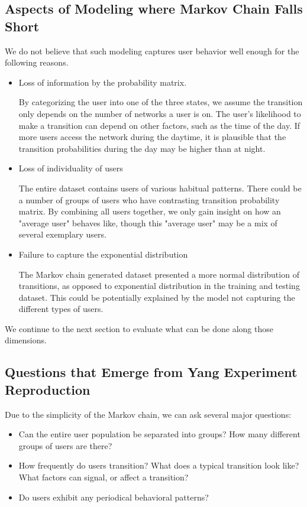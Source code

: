 \documentclass[]{article}
\begin{document}
\subsection{Aspects of Modeling where Markov Chain Falls Short}
We do not believe that such modeling captures user behavior well enough for the following reasons.

\begin{itemize}
\item
Loss of information by the probability matrix.

By categorizing the user into one of the three states, we assume the transition only depends on the number of networks a user is on. The user's likelihood to make a transition can depend on other factors, such as the time of the day. If more users access the network during the daytime, it is plausible that the transition probabilities during the day may be higher than at night.

\item
Loss of individuality of users

The entire dataset contains users of various habitual patterns. There could be a number of groups of users who have contrasting transition probability matrix. By combining all users together, we only gain insight on how an "average user" behaves like, though this "average user" may be a mix of several exemplary users.

\item
Failure to capture the exponential distribution

The Markov chain generated dataset presented a more normal distribution of transitions, as opposed to exponential distribution in the training and testing dataset. This could be potentially explained by the model not capturing the different types of users.
\end{itemize}

We continue to the next section to evaluate what can be done along those dimensions.


\subsection{Questions that Emerge from Yang Experiment Reproduction}
Due to the simplicity of the Markov chain, we can ask several major questions: 

\begin{itemize}
\item
Can the entire user population be separated into groups? How many different groups of users are there? 
\item
How frequently do users transition? What does a typical transition look like? What factors can signal, or affect a transition?
\item
Do users exhibit any periodical behavioral patterns?
\end{itemize}
\end{document}
